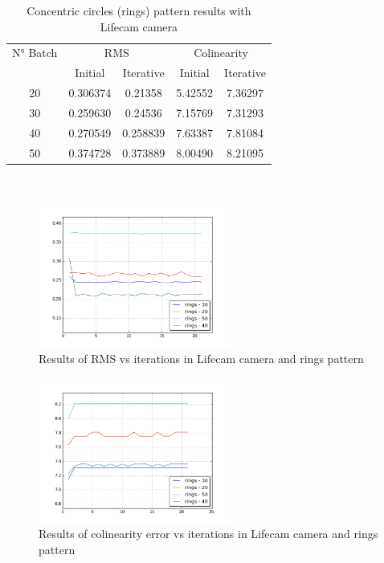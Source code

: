 \documentclass[journal]{IEEEtran}
\begin{document}
\begin{table}[h]
\centering
\caption{Concentric circles (rings) pattern results with Lifecam camera}
\begin{tabular}{ |c||c|c|c|c|  }
 \hline
 N° Batch & \multicolumn{2}{c|}{RMS} & \multicolumn{2}{c|}{Colinearity}\\
 \cline{2-5}
 & Initial & Iterative & Initial & Iterative \\
 \hline
 20        & 0.306374 & 0.21358 & 5.42552 & 7.36297 \\
 30        & 0.259630 & 0.24536 & 7.15769 & 7.31293 \\
 40        & 0.270549 & 0.258839 & 7.63387 & 7.81084 \\
 50        & 0.374728 & 0.373889 & 8.00490 & 8.21095 \\
 \hline
\end{tabular}
\\
\end{table}

\begin{figure}[H]
\centering
\includegraphics[width=2.5in]{_img/report_4/img_results_lifecam_rings.png}
\caption{Results of RMS vs iterations in Lifecam camera and rings pattern}
\end{figure}

\begin{figure}[H]
\centering
\includegraphics[width=2.5in]{_img/report_4/img_results_lifecam_colinearity_rings.png}
\caption{Results of colinearity error vs iterations in Lifecam camera and rings pattern}
\end{figure}
\end{document}
